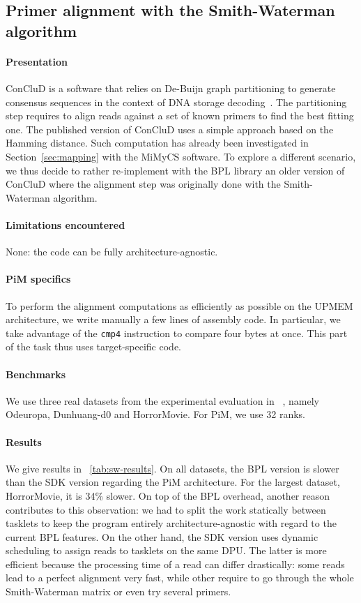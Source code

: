 \subsection{Primer alignment with the Smith-Waterman algorithm}
\label{sec:conclud}

\paragraph{Presentation}ConCluD is a software that relies on De-Buijn graph partitioning to generate consensus sequences in the context of DNA storage decoding~\cite{DeMoor2025}.
The partitioning step requires to align reads against a set of known primers to find the best fitting one.
The published version of ConCluD uses a simple approach based on the Hamming distance.
Such computation has already been investigated in Section~\ref{sec:mapping} with the MiMyCS software.
To explore a different scenario, we thus decide to rather re-implement with the BPL library an older version of ConCluD where the alignment step was originally done with the Smith-Waterman algorithm.

\paragraph{Limitations encountered} None: the code can be fully architecture-agnostic.

\paragraph{PiM specifics} To perform the alignment computations as efficiently as possible on the UPMEM architecture, we write manually a few lines of assembly code.
In particular, we take advantage of the \texttt{cmp4} instruction to compare four bytes at once.
This part of the task thus uses target-specific code.

\paragraph{Benchmarks} We use three real datasets from the experimental evaluation in ~\cite{DeMoor2025}, namely Odeuropa, Dunhuang-d0 and HorrorMovie.
For PiM, we use 32 ranks.

\paragraph{Results} We give results in \tablename~\ref{tab:sw-results}.
On all datasets, the BPL version is slower than the SDK version regarding the PiM architecture.
For the largest dataset, HorrorMovie, it is 34\% slower.
On top of the BPL overhead, another reason contributes to this observation: we had to split the work statically between tasklets to keep the program entirely architecture-agnostic with regard to the current BPL features.
On the other hand, the SDK version uses dynamic scheduling to assign reads to tasklets on the same DPU.
The latter is more efficient because the processing time of a read can differ drastically: some reads lead to a perfect alignment very fast, while other require to go through the whole Smith-Waterman matrix or even try several primers.

